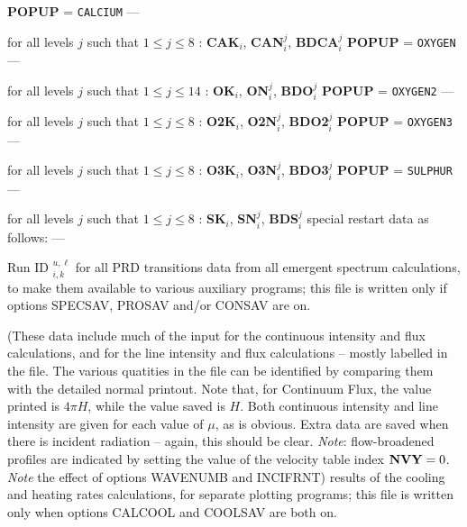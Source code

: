 \spice
{} {\bf POPUP} = {\tt CALCIUM} --- \par \noindent
for all levels $j$ such that $1 \leq j \leq 8$ :
{\bf CAK}$_i$, {\bf CAN}$^j_i$, {\bf BDCA}$^j_i$
\spice
{} {\bf POPUP} = {\tt OXYGEN} --- \par \noindent
for all levels $j$ such that $1 \leq j \leq 14$ :
{\bf OK}$_i$, {\bf ON}$^j_i$, {\bf BDO}$^j_i$
\spice
{} {\bf POPUP} = {\tt OXYGEN2} --- \par \noindent
for all levels $j$ such that $1 \leq j \leq 8$ :
{\bf O2K}$_i$, {\bf O2N}$^j_i$, {\bf BDO2}$^j_i$
\spice
{} {\bf POPUP} = {\tt OXYGEN3} --- \par \noindent
for all levels $j$ such that $1 \leq j \leq 8$ :
{\bf O3K}$_i$, {\bf O3N}$^j_i$, {\bf BDO3}$^j_i$
\spice
{} {\bf POPUP} = {\tt SULPHUR} --- \par \noindent
for all levels $j$ such that $1 \leq j \leq 8$ :
{\bf SK}$_i$, {\bf SN}$^j_i$, {\bf BDS}$^j_i$
\ej
{} special restart data
as follows:
\blankline
{} --- \par \noindent
Run ID
\spice
{}$^{u,\ell}_{i,k}$ for all PRD transitions
\blankline
\blankline
{} 
data from all emergent spectrum calculations, to make them available
to various auxiliary programs; this file is written
only if options SPECSAV, PROSAV and/or CONSAV are on. \par
\spice
\vbox{\parindent=0pt \hangindent=10pt 
(These data include much of the input for the continuous intensity
and flux calculations, and for the line intensity and flux calculations --
mostly labelled in the file. The various quatities in the file can be
identified by comparing them with the detailed normal printout. Note
that, for Continuum Flux, the value printed is $4 \pi H$, while the
value saved is $H$. Both continuous intensity and line intensity are
given for each value of $\mu$, as is obvious. Extra data are saved when
there is incident radiation -- again, this should be clear.
{\it Note}: flow-broadened profiles are indicated by setting the value
of the velocity table index ${\bf NVY} = 0$.
{\it Note} the effect of options WAVENUMB and INCIFRNT)}
\blankline
\blankline
{} 
results of the cooling and heating rates calculations, for separate
plotting programs; this file is written only when options
CALCOOL and COOLSAV are both on. \par
